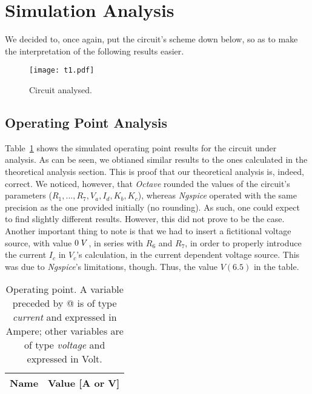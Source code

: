 \newpage
\section{Simulation Analysis}
\label{sec:simulation}

We decided to, once again, put the circuit's scheme down below, so as to make the interpretation of the following results easier.
\begin{figure}[h] \centering
  \texttt{[image: t1.pdf]}
  \caption{Circuit analysed.}
  \label{fig:op}
\end{figure}

\subsection{Operating Point Analysis}

Table~\ref{tab:op} shows the simulated operating point results for the circuit
under analysis. As can be seen, we obtianed similar results to the ones calculated in the theoretical analysis section. This is proof that our theoretical analysis is, indeed, correct.
We noticed, however, that \emph{Octave} rounded the values of the circuit's parameters ($R_{1}, ..., R_{7}, V_{a}, I_{d}, K_{b}, K_{c}$), whereas \emph{Ngspice} operated with the same precision as the one provided initially (no rounding).
As such, one could expect to find slightly different results. However, this did not prove to be the case. Another important thing to note is that we had to insert a fictitional
voltage source, with value $0\hspace{1mm}V$, in series with $R_{6}$ and $R_{7}$, in order to properly introduce the current $I_{c}$ in $V_{c}$'s calculation, in the current dependent
voltage source. This was due to \emph{Ngspice}'s limitations, though. Thus,
the value $V(6.5)$ in the table.

\begin{table}[h]
  \centering
  \begin{tabular}{|l|r|}
    \hline    
    {\bf Name} & {\bf Value [A or V]} \\ \hline
    
  \end{tabular}
  \caption{Operating point. A variable preceded by @ is of type {\em current}
    and expressed in Ampere; other variables are of type {\it voltage} and expressed in
    Volt.}
  \label{tab:op}
\end{table}


